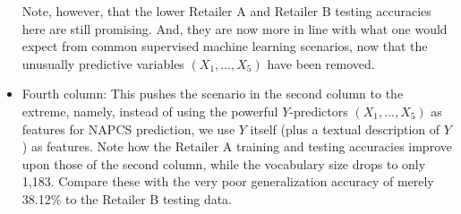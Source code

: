 \begin{itemize}
	\vskip 0.1cm
	Note, however, that the lower Retailer A and Retailer B testing accuracies here
	are still promising. And, they are now more in line with what one would expect
	from common supervised machine learning scenarios, now that the unusually
	predictive variables $(X_{1}, \ldots ,X_{5})$ have been removed.

\item
	Fourth column:\;\;
	This pushes the scenario in the second column to the extreme, namely,
	instead of using the powerful $Y$-predictors $(X_{1}, \ldots ,X_{5})$
	as features for NAPCS prediction, we use $Y$ itself (plus a textual description
	of $Y$) as features. Note how the Retailer A training and testing accuracies
	improve upon those of the second column, while the vocabulary size drops to
	only 1,183. Compare these with the very poor generalization accuracy of
	merely 38.12\% to the Retailer B testing data.

\end{itemize}

